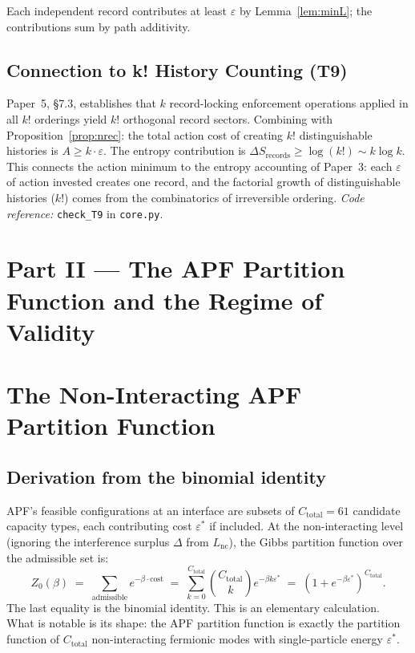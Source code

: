 \documentclass[11pt]{article}
\newcommand{\coderef}[2]{\smallskip\noindent\textit{Code reference:} \texttt{#1} in \texttt{#2}.}
\theoremstyle{definition}
\begin{document}
Each independent record contributes at least $\varepsilon$ by Lemma~\ref{lem:minL}; the contributions sum by path additivity.

\subsection{Connection to k! History Counting (T9)}
Paper~5, \S 7.3, establishes that $k$ record-locking enforcement operations applied in all $k!$ orderings yield $k!$ orthogonal record sectors.  Combining with Proposition~\ref{prop:nrec}: the total action cost of creating $k!$ distinguishable histories is $A \ge k \cdot \varepsilon$.  The entropy contribution is $\Delta S_{\mathrm{records}} \ge \log(k!) \sim k \log k$.  This connects the action minimum to the entropy accounting of Paper~3: each $\varepsilon$ of action invested creates one record, and the factorial growth of distinguishable histories ($k!$) comes from the combinatorics of irreversible ordering.
\coderef{check\_T9}{core.py}

\section*{Part II — The APF Partition Function and the Regime of Validity}

\section{The Non-Interacting APF Partition Function}\label{sec:partfn}

\subsection{Derivation from the binomial identity}
APF's feasible configurations at an interface are subsets of $C_{\mathrm{total}} = 61$ candidate capacity types, each contributing cost $\varepsilon^*$ if included.  At the non-interacting level (ignoring the interference surplus $\Delta$ from $L_{\mathrm{nc}}$), the Gibbs partition function over the admissible set is:
\[
Z_0(\beta) \;=\; \sum_{\text{admissible}} e^{-\beta \cdot \text{cost}} \;=\; \sum_{k=0}^{C_{\mathrm{total}}} \binom{C_{\mathrm{total}}}{k} e^{-\beta k \varepsilon^*}
\;=\; \left(1 + e^{-\beta \varepsilon^*}\right)^{C_{\mathrm{total}}}.
\]
The last equality is the binomial identity.  This is an elementary calculation.  What is notable is its shape: the APF partition function is exactly the partition function of $C_{\mathrm{total}}$ non-interacting fermionic modes with single-particle energy $\varepsilon^*$.
\end{document}
